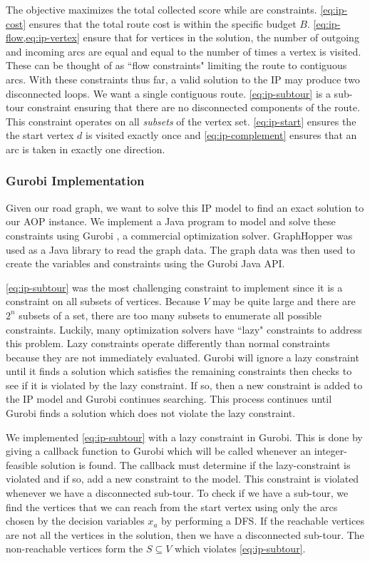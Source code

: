\documentclass[honors]{union-cs-thesis}
\newcommand{\sse}{\subseteq} %
\begin{document}
The objective maximizes the total collected score while  are constraints. \cref{eq:ip-cost} ensures that the total route cost is within the specific budget $B$. \cref{eq:ip-flow,eq:ip-vertex} ensure that for vertices in the solution, the number of outgoing and incoming arcs are equal and equal to the number of times a vertex is visited. These can be thought of as ``flow constraints" limiting the route to contiguous arcs. With these constraints thus far, a valid solution to the IP may produce two disconnected loops. We want a single contiguous route. \cref{eq:ip-subtour} is a sub-tour constraint ensuring that there are no disconnected components of the route. This constraint operates on all \emph{subsets} of the vertex set. \cref{eq:ip-start} ensures the the start vertex $d$ is visited exactly once and  \cref{eq:ip-complement} ensures that an arc is taken in exactly one direction.
 
\subsubsection{Gurobi Implementation}
Given our road graph, we want to solve this IP model to find an exact solution to our AOP instance. We implement a Java program to model and solve these constraints using Gurobi \cite{gurobi}, a commercial optimization solver. GraphHopper was used as a Java library to read the graph data. The graph data was then used to create the variables and constraints using the Gurobi Java API. 

\cref{eq:ip-subtour} was the most challenging constraint to implement since it is a constraint on all subsets of vertices. Because $V$ may be quite large and there are $2^n$ subsets of a set, there are too many subsets to enumerate all possible constraints. Luckily, many optimization solvers have ``lazy" constraints to address this problem. Lazy constraints operate differently than normal constraints because they are not immediately evaluated. Gurobi will ignore a lazy constraint until it finds a solution which satisfies the remaining constraints then checks to see if it is violated by the lazy constraint. If so, then a new constraint is added to the IP model and Gurobi continues searching. This process continues until Gurobi finds a solution which does not violate the lazy constraint.
 
We implemented \cref{eq:ip-subtour} with a lazy constraint in Gurobi. This is done by giving a callback function to Gurobi which will be called whenever an integer-feasible solution is found. The callback must determine if the lazy-constraint is violated and if so, add a new constraint to the model. This constraint is violated whenever we have a disconnected sub-tour. To check if we have a sub-tour, we find the vertices that we can reach from the start vertex using only the arcs chosen by the decision variables $x_a$ by performing a DFS. If the reachable vertices are not all the vertices in the solution, then we have a disconnected sub-tour. The non-reachable vertices form the $S \sse V$ which violates \cref{eq:ip-subtour}.
\end{document}

